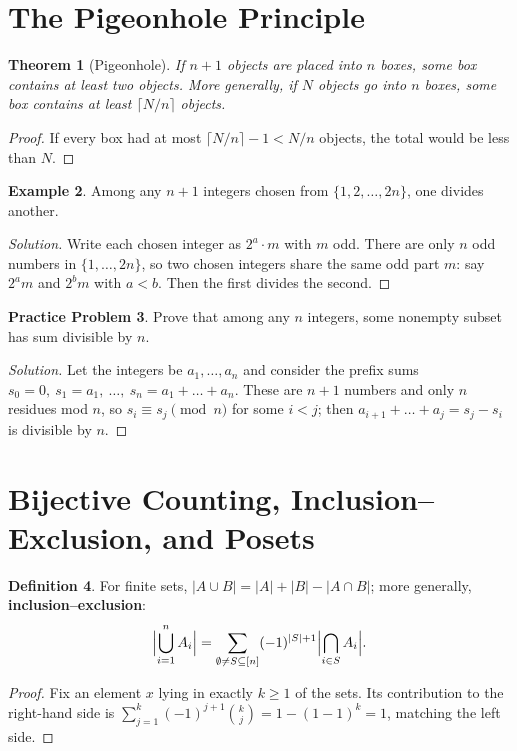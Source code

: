 \documentclass[11pt]{article}
\theoremstyle{plain}
\newtheorem{theorem}{Theorem}[section]
\theoremstyle{definition}
\newtheorem{definition}[theorem]{Definition}
\newtheorem{example}[theorem]{Example}
\newtheorem{problem}[theorem]{Practice Problem}
\newenvironment{solution}{\begin{proof}[Solution]}{\end{proof}}
\begin{document}
\section{The Pigeonhole Principle}

\begin{theorem}[Pigeonhole]
If $n+1$ objects are placed into $n$ boxes, some box contains at least two
objects. More generally, if $N$ objects go into $n$ boxes, some box contains
at least $\lceil N/n \rceil$ objects.
\end{theorem}
\begin{proof}
If every box had at most $\lceil N/n\rceil - 1 < N/n$ objects, the total would
be less than $N$.
\end{proof}

\begin{example}
Among any $n+1$ integers chosen from $\{1, 2, \dots, 2n\}$, one divides another.
\end{example}
\begin{solution}
Write each chosen integer as $2^a \cdot m$ with $m$ odd. There are only $n$
odd numbers in $\{1,\dots,2n\}$, so two chosen integers share the same odd
part $m$: say $2^a m$ and $2^b m$ with $a<b$. Then the first divides the second.
\end{solution}

\begin{problem}
Prove that among any $n$ integers, some nonempty subset has sum divisible by $n$.
\end{problem}
\begin{solution}
Let the integers be $a_1,\dots,a_n$ and consider the prefix sums
$s_0 = 0,\ s_1 = a_1,\ \dots,\ s_n = a_1+\dots+a_n$. These are $n+1$ numbers
and only $n$ residues mod $n$, so $s_i \equiv s_j \pmod n$ for some $i<j$;
then $a_{i+1}+\dots+a_j = s_j - s_i$ is divisible by $n$.
\end{solution}

\section{Bijective Counting, Inclusion--Exclusion, and Posets}

\begin{definition}
For finite sets, $|A \cup B| = |A|+|B|-|A\cap B|$; more generally,
\textbf{inclusion--exclusion}:
\[
\Bigl|\bigcup_{i=1}^n A_i\Bigr| = \sum_{\emptyset \ne S \subseteq [n]}
(-1)^{|S|+1}\Bigl|\bigcap_{i\in S}A_i\Bigr|.
\]
\end{definition}
\begin{proof}
Fix an element $x$ lying in exactly $k \ge 1$ of the sets. Its contribution to
the right-hand side is $\sum_{j=1}^{k}(-1)^{j+1}\binom kj = 1 - (1-1)^k = 1$,
matching the left side.
\end{proof}
\end{document}
